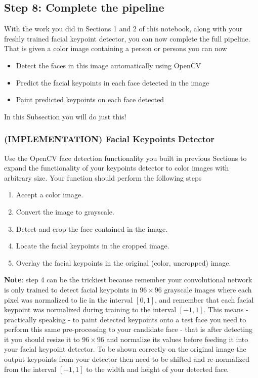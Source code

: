 \documentclass[11pt]{article}
\providecommand{\tightlist}{%
      \setlength{\itemsep}{0pt}\setlength{\parskip}{0pt}}
\begin{document}
\hypertarget{step-8-complete-the-pipeline}{%
\subsection{Step 8: Complete the
pipeline}\label{step-8-complete-the-pipeline}}

With the work you did in Sections 1 and 2 of this notebook, along with
your freshly trained facial keypoint detector, you can now complete the
full pipeline. That is given a color image containing a person or
persons you can now

\begin{itemize}
\tightlist
\item
  Detect the faces in this image automatically using OpenCV
\item
  Predict the facial keypoints in each face detected in the image
\item
  Paint predicted keypoints on each face detected
\end{itemize}

In this Subsection you will do just this!

    \hypertarget{implementation-facial-keypoints-detector}{%
\subsubsection{(IMPLEMENTATION) Facial Keypoints
Detector}\label{implementation-facial-keypoints-detector}}

Use the OpenCV face detection functionality you built in previous
Sections to expand the functionality of your keypoints detector to color
images with arbitrary size. Your function should perform the following
steps

\begin{enumerate}
\def\labelenumi{\arabic{enumi}.}
\tightlist
\item
  Accept a color image.
\item
  Convert the image to grayscale.
\item
  Detect and crop the face contained in the image.
\item
  Locate the facial keypoints in the cropped image.
\item
  Overlay the facial keypoints in the original (color, uncropped) image.
\end{enumerate}

\textbf{Note}: step 4 can be the trickiest because remember your
convolutional network is only trained to detect facial keypoints in
\(96 \times 96\) grayscale images where each pixel was normalized to lie
in the interval \([0,1]\), and remember that each facial keypoint was
normalized during training to the interval \([-1,1]\). This means -
practically speaking - to paint detected keypoints onto a test face you
need to perform this same pre-processing to your candidate face - that
is after detecting it you should resize it to \(96 \times 96\) and
normalize its values before feeding it into your facial keypoint
detector. To be shown correctly on the original image the output
keypoints from your detector then need to be shifted and re-normalized
from the interval \([-1,1]\) to the width and height of your detected
face.
\end{document}
